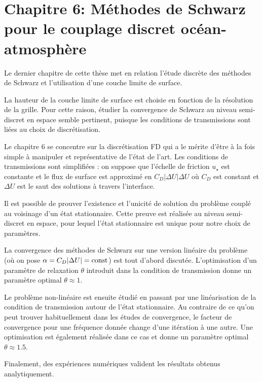 \section*{Chapitre 6: Méthodes de Schwarz pour le couplage
discret océan-atmosphère}
Le dernier chapitre de cette thèse met en relation l'étude discrète
des méthodes de Schwarz et l'utilisation d'une couche limite de
surface.
	\par La hauteur de la couche limite de surface est
		choisie en fonction de la résolution de la grille.
		Pour cette raison, étudier la convergence de Schwarz
		au niveau semi-discret en espace semble pertinent,
		puisque les conditions de transmissions sont
		liées au choix de discrétisation.
	\par Le chapitre 6 se concentre sur la discrétisation FD
		qui a le mérite d'être à la fois simple à
		manipuler et représentative de l'état de l'art.
		Les conditions de transmissions sont simplifiées :
		on suppose que l'échelle de friction $u_\star$
		est constante et le flux de surface est approximé
		en $C_D |\Delta U| \Delta U$ où $C_D$ est constant
		et $\Delta U$ est le saut des solutions à travers
		l'interface.
	\par Il est possible de prouver l'existence et l'unicité de
		solution du problème couplé au voisinage d'un état
		stationnaire. Cette preuve est réalisée au niveau
		semi-discret en espace, pour lequel l'état
		stationnaire est unique pour notre choix de
		paramètres.
	\par La convergence des méthodes de Schwarz sur une version
		linéaire du problème (où on pose
		$\alpha=C_D |\Delta U| = {\rm const}$)
		est tout d'abord discutée. L'optimisation d'un
		paramètre de relaxation $\theta$ introduit dans
		la condition de transmission donne un paramètre
		optimal $\theta \approx 1$.
	\par Le problème non-linéaire est ensuite étudié en passant
		par une linéarisation de la condition de transmission
		autour de l'état stationnaire. Au contraire
		de ce qu'on peut trouver habituellement dans
		les études de convergence,
		le facteur de convergence pour une fréquence donnée
		change d'une itération à une autre. 
		Une optimisation est également réalisée dans ce cas
		et donne un paramètre optimal $\theta \approx 1.5$.
	\par Finalement, des expériences numériques
		valident les résultats obtenus analytiquement.
